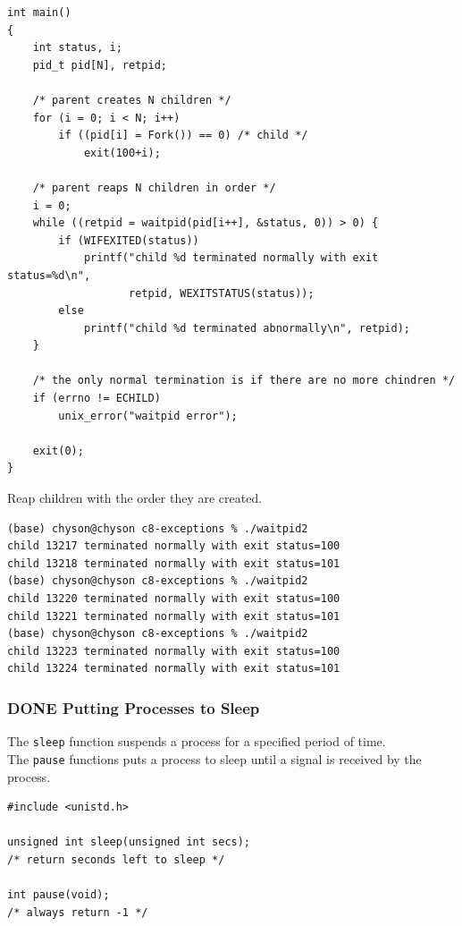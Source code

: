 \documentclass[11pt]{article}
\begin{document}
\begin{enumerate}
\begin{verbatim}
int main()
{
    int status, i;
    pid_t pid[N], retpid;

    /* parent creates N children */
    for (i = 0; i < N; i++)
        if ((pid[i] = Fork()) == 0) /* child */
            exit(100+i);

    /* parent reaps N children in order */
    i = 0;
    while ((retpid = waitpid(pid[i++], &status, 0)) > 0) {
        if (WIFEXITED(status))
            printf("child %d terminated normally with exit status=%d\n",
                   retpid, WEXITSTATUS(status));
        else
            printf("child %d terminated abnormally\n", retpid);
    }

    /* the only normal termination is if there are no more chindren */
    if (errno != ECHILD)
        unix_error("waitpid error");

    exit(0);
}

\end{verbatim}

Reap children with the order they are created.\\
\begin{verbatim}
(base) chyson@chyson c8-exceptions % ./waitpid2
child 13217 terminated normally with exit status=100
child 13218 terminated normally with exit status=101
(base) chyson@chyson c8-exceptions % ./waitpid2
child 13220 terminated normally with exit status=100
child 13221 terminated normally with exit status=101
(base) chyson@chyson c8-exceptions % ./waitpid2
child 13223 terminated normally with exit status=100
child 13224 terminated normally with exit status=101
\end{verbatim}
\end{enumerate}




\subsubsection{{\bfseries\sffamily DONE} Putting Processes to Sleep}
\label{sec:org631da6c}
The \texttt{sleep} function suspends a process for a specified period of time.\\
The \texttt{pause} functions puts a process to sleep until a signal is received by the process.\\

\begin{verbatim}
#include <unistd.h>

unsigned int sleep(unsigned int secs);
/* return seconds left to sleep */

int pause(void);
/* always return -1 */
\end{verbatim}
\end{document}
